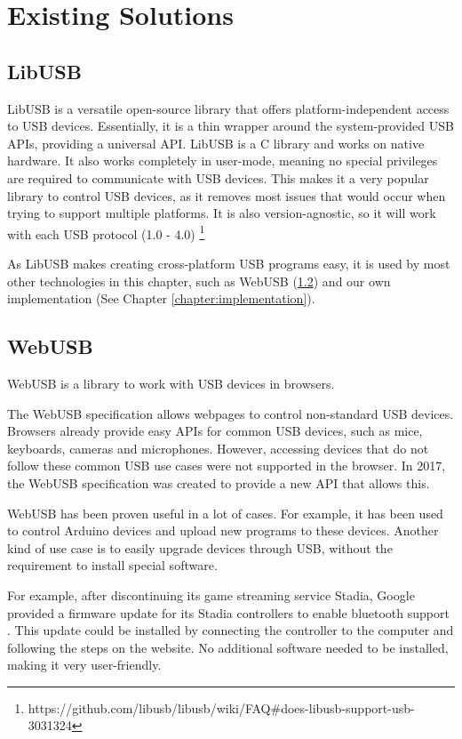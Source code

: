 \section{Existing Solutions}

\subsection{LibUSB}
\label{section:libusb}
LibUSB \cite{LibUSB} is a versatile open-source library that offers platform-independent access to USB devices. Essentially, it is a thin wrapper around the system-provided USB APIs, providing a universal API. LibUSB is a C library and works on native hardware. It also works completely in user-mode, meaning no special privileges are required to communicate with USB devices. This makes it a very popular library to control USB devices, as it removes most issues that would occur when trying to support multiple platforms. It is also version-agnostic, so it will work with each USB protocol (1.0 - 4.0) \footnote{https://github.com/libusb/libusb/wiki/FAQ\#does-libusb-support-usb-3031324}

As LibUSB makes creating cross-platform USB programs easy, it is used by most other technologies in this chapter, such as WebUSB (\ref{section:WebUSB}) and our own implementation (See Chapter \ref{chapter:implementation}).

\subsection{WebUSB}
\label{section:WebUSB}

WebUSB \cite{WebUSB} is a library to work with USB devices in browsers.

The WebUSB specification allows webpages to control non-standard USB devices. Browsers already provide easy APIs for common USB devices, such as mice, keyboards, cameras and microphones. However, accessing devices that do not follow these common USB use cases were not supported in the browser. In 2017, the WebUSB specification was created to provide a new API that allows this.

WebUSB has been proven useful in a lot of cases. For example, it has been used to control Arduino devices and upload new programs to these devices. Another kind of use case is to easily upgrade devices through USB, without the requirement to install special software. 

For example, after discontinuing its game streaming service Stadia, Google provided a firmware update for its Stadia controllers to enable bluetooth support \cite{stadia_bluetooth_mode} \cite{stadia_bluetooth_mode_explanation}. This update could be installed by connecting the controller to the computer and following the steps on the website. No additional software needed to be installed, making it very user-friendly.

